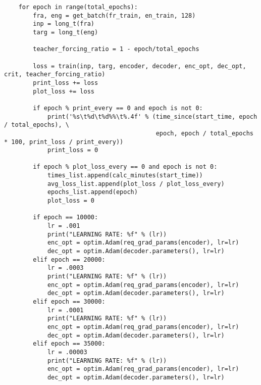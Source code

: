 \begin{lstlisting}
    for epoch in range(total_epochs):
        fra, eng = get_batch(fr_train, en_train, 128)
        inp = long_t(fra)
        targ = long_t(eng)
        
        teacher_forcing_ratio = 1 - epoch/total_epochs
        
        loss = train(inp, targ, encoder, decoder, enc_opt, dec_opt, crit, teacher_forcing_ratio)
        print_loss += loss
        plot_loss += loss

        if epoch % print_every == 0 and epoch is not 0:
            print('%s\t%d\t%d%%\t%.4f' % (time_since(start_time, epoch / total_epochs), \
                                          epoch, epoch / total_epochs * 100, print_loss / print_every))
            print_loss = 0
        
        if epoch % plot_loss_every == 0 and epoch is not 0:
            times_list.append(calc_minutes(start_time))
            avg_loss_list.append(plot_loss / plot_loss_every)
            epochs_list.append(epoch)
            plot_loss = 0
        
        if epoch == 10000:
            lr = .001
            print("LEARNING RATE: %f" % (lr))
            enc_opt = optim.Adam(req_grad_params(encoder), lr=lr)
            dec_opt = optim.Adam(decoder.parameters(), lr=lr)
        elif epoch == 20000:
            lr = .0003
            print("LEARNING RATE: %f" % (lr))
            enc_opt = optim.Adam(req_grad_params(encoder), lr=lr)
            dec_opt = optim.Adam(decoder.parameters(), lr=lr)
        elif epoch == 30000:
            lr = .0001
            print("LEARNING RATE: %f" % (lr))
            enc_opt = optim.Adam(req_grad_params(encoder), lr=lr)
            dec_opt = optim.Adam(decoder.parameters(), lr=lr)
        elif epoch == 35000:
            lr = .00003
            print("LEARNING RATE: %f" % (lr))
            enc_opt = optim.Adam(req_grad_params(encoder), lr=lr)
            dec_opt = optim.Adam(decoder.parameters(), lr=lr)
\end{lstlisting}